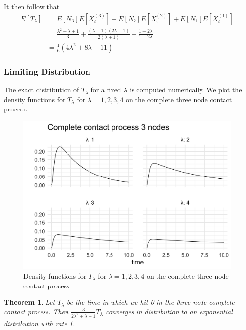 \documentclass{article}
\theoremstyle{plain}
\newtheorem{theorem}{Theorem}[section]
\theoremstyle{definition}
\theoremstyle{remark}
\numberwithin{equation}{section}
\begin{document}
It then follow that
\begin{align*}
        E[T_\lambda] &= E[N_3] E[X_i^{(3)}] + E[N_2] E[X_i^{(2)}] + E[N_1] E[X_i^{(1)}]\\
        &= \frac{\lambda^2 + \lambda + 1}{3} + \frac{(\lambda + 1)(2 \lambda + 1)}{2 (\lambda + 1)} + \frac{1 + 2\lambda}{1 + 2 \lambda}\\
        &= \frac{1}{6}(4 \lambda^2 + 8 \lambda + 11)
\end{align*}

\subsubsection{Limiting Distribution}

The exact distribution of $T_\lambda$ for a fixed $\lambda$ is computed numerically.
We plot the density functions for $T_\lambda$ for $\lambda = 1, 2, 3, 4$ on the complete three node contact process.

\begin{figure}
  \centering
    \includegraphics[width=.80\textwidth]{figures/complete_3_contact_phase_densities.png}
   \caption{Density functions for $T_\lambda$ for $\lambda = 1, 2, 3, 4$ on the complete three node contact process}
  \label{fig:contact_3_phase_densities}
\end{figure}

\begin{theorem}
Let $T_\lambda$ be the time in which we hit 0 in the three node complete contact process.
Then $\frac{3}{2 \lambda^2 + \lambda + 1} T_\lambda$ converges in distribution to an exponential distribution with rate 1.
\end{theorem}
\end{document}
